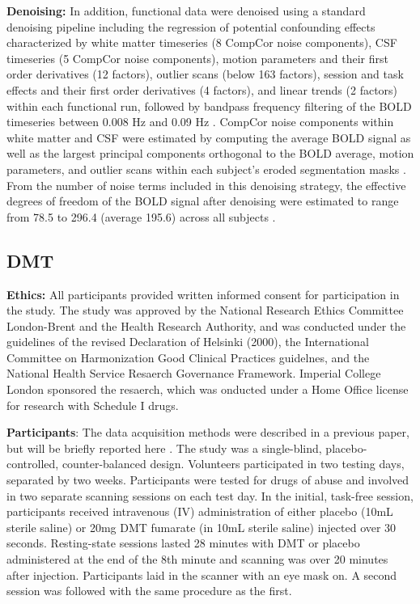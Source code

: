 \textbf{Denoising:} In addition, functional data were denoised using a
standard denoising pipeline including the regression of potential
confounding effects characterized by white matter timeseries (8 CompCor
noise components), CSF timeseries (5 CompCor noise components), motion
parameters and their first order derivatives (12 factors), outlier scans
(below 163 factors), session and task effects and their first order
derivatives (4 factors), and linear trends (2 factors) within each
functional run, followed by bandpass frequency filtering of the BOLD
timeseries between 0.008 Hz and 0.09 Hz \parencite{Friston1996,Hallquist2013,Nieto-Castanon2020,Power2014}.
CompCor noise components within white matter and CSF were estimated by
computing the average BOLD signal as well as the largest principal
components orthogonal to the BOLD average, motion parameters, and
outlier scans within each subject's eroded segmentation masks \parencite{Behzadi2007,Chai2012}. From the number of noise terms
included in this denoising strategy, the effective degrees of freedom of
the BOLD signal after denoising were estimated to range from 78.5 to
296.4 (average 195.6) across all subjects \parencite{Nieto-Castanon2022a}.

\subsection{DMT}\label{dmt}

\textbf{Ethics:} All participants provided written informed consent for
participation in the study. The study was approved by the National
Research Ethics Committee London-Brent and the Health Research
Authority, and was conducted under the guidelines of the revised
Declaration of Helsinki (2000), the International Committee on
Harmonization Good Clinical Practices guidelnes, and the National Health
Service Resaerch Governance Framework. Imperial College London sponsored
the resaerch, which was onducted under a Home Office license for
research with Schedule I drugs.

\textbf{Participants}: The data acquisition methods were described in a
previous paper, but will be briefly reported here \parencite{Timmermann2023}. The study was a single-blind, placebo-controlled,
counter-balanced design. Volunteers participated in two testing days,
separated by two weeks. Participants were tested for drugs of abuse and
involved in two separate scanning sessions on each test day. In the
initial, task-free session, participants received intravenous (IV)
administration of either placebo (10mL sterile saline) or 20mg DMT
fumarate (in 10mL sterile saline) injected over 30 seconds.
Resting-state sessions lasted 28 minutes with DMT or placebo
administered at the end of the 8th minute and scanning was over 20
minutes after injection. Participants laid in the scanner with an eye
mask on. A second session was followed with the same procedure as the
first.

